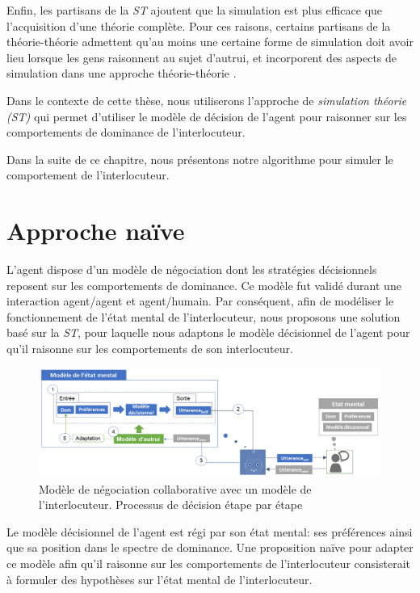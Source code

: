 Enfin, les partisans de la \emph{ST} ajoutent que la simulation est plus efficace que l'acquisition d'une théorie complète. Pour ces raisons, certains partisans de la théorie-théorie admettent qu'au moins une certaine forme de simulation doit avoir lieu lorsque les gens raisonnent au sujet d'autrui, et incorporent des aspects de simulation dans une approche théorie-théorie \cite{harbers2012modeling}.

Dans le contexte de cette thèse, nous utiliserons l'approche de \emph{simulation théorie (ST)} qui permet d'utiliser le modèle de décision de l'agent pour raisonner sur les comportements de dominance de l'interlocuteur. 

Dans la suite de ce chapitre, nous présentons notre algorithme pour simuler le comportement de l'interlocuteur.


\section{Approche naïve}
L'agent dispose d'un modèle de négociation dont les stratégies décisionnels reposent sur les comportements de dominance. Ce modèle fut validé durant une interaction agent/agent et agent/humain. Par conséquent, afin de modéliser le fonctionnement de l'état mental de l'interlocuteur, nous proposons une solution basé sur la \emph{ST}, pour laquelle nous adaptons le modèle décisionnel de l'agent pour qu'il raisonne sur les comportements de son interlocuteur. 

\begin{figure}
	\centering
	\includegraphics[width=\linewidth, height=0.35\textheight]{Figures/chap5/model/general.png}
	\caption{Modèle de négociation collaborative avec un modèle de l'interlocuteur. Processus de décision étape par étape} 
	\label{fig:schema-general}
\end{figure}
	



Le modèle décisionnel de l'agent est régi par son état mental: ses préférences ainsi que sa position dans le spectre de dominance. Une proposition naïve pour adapter ce modèle afin qu'il raisonne sur les comportements de l'interlocuteur consisterait à formuler des hypothèses sur l'état mental de l'interlocuteur. 

